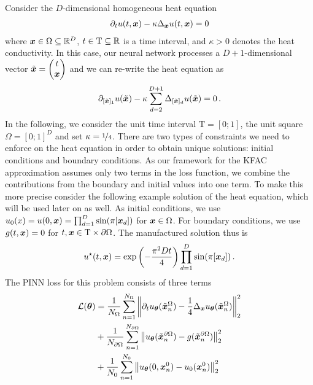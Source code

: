 Consider the $D$-dimensional%
homogeneous heat equation
\begin{align*}
  \partial_{t} u(t, {\bm{x}})
  -
  \kappa \Delta_{{\bm{x}}} u(t, {\bm{x}})
  =
  0
\end{align*}
where ${\bm{x}} \in \Omega \subseteq {\mathbb{R}}^D$, $t \in \mathrm{T} \subseteq {\mathbb{R}}$ is a time interval, and $\kappa >0$ denotes the heat conductivity. In this case, our neural network processes a $D+1$-dimensional vector $\tilde{{\bm{x}}} =
\begin{pmatrix} t \\ {\bm{x}} \end{pmatrix}$ and we can re-write the heat equation as
\begin{align*}
  \partial_{[\tilde{{\bm{x}}}]_1} u(\tilde{{\bm{x}}})
  -
  \kappa \sum_{d=2}^{D+1} \Delta_{[\tilde{{\bm{x}}}]_d} u(\tilde{{\bm{x}}})
  =
  0\,.
\end{align*}
In the following, we consider the unit time interval $\mathrm{T} = [0;1]$, the unit square $\Omega = [0;1]^D$ and set $\kappa = \nicefrac{1}{4}$. There are two types of constraints we need to enforce on the heat equation in order to obtain unique solutions: initial conditions and boundary conditions. As our framework for the KFAC approximation assumes only two terms in the loss function, we combine the contributions from the boundary and initial values into one term. To make this more precise consider the following example solution of the heat equation, which will be used later on as well.
As initial conditions, we use $u_0(x) = u(0, {\bm{x}}) = \prod_{d=1}^D \sin(\pi [{\bm{x}}_d])$ for ${\bm{x}} \in \Omega$.
For boundary conditions, we use $g(t, {\bm{x}}) = 0$ for $t, {\bm{x}} \in \mathrm{T} \times \partial\Omega$.
The manufactured solution thus is
\begin{align*}
  u^{\star}(t, {\bm{x}})
  =
  \exp \left(-\frac{\pi^2 D t}{4} \right)
  \prod_{d=1}^D \sin(\pi [{\bm{x}}_d])\,.
\end{align*}
The PINN loss for this problem consists of three terms
\begin{align*}
  {\mathcal{L}}({\bm{\theta}})
  &=
    \frac{1}{N_{\Omega}}
    \sum_{n=1}^{N_{\Omega}}
    \left\lVert
    \partial_t u_{{\bm{\theta}}}(\tilde{{\bm{x}}}_n^{\Omega})
    -
    \frac{1}{4} \Delta_{{\bm{x}}} u_{{\bm{\theta}}}(\tilde{{\bm{x}}}_n^{\Omega})
    \right\rVert^2_2
  \\
  &+
    \frac{1}{N_{\partial\Omega}}
    \sum_{n=1}^{N_{\partial\Omega}}
    \left\lVert
    u_{{\bm{\theta}}}(\tilde{{\bm{x}}}_n^{\partial\Omega})
    -
    g(\tilde{{\bm{x}}}_n^{\partial\Omega})
    \right\rVert^2_2
  \\
  &+
    \frac{1}{N_0}
    \sum_{n=1}^{N_0}
    \left\lVert
    u_{{\bm{\theta}}}(0, {\bm{x}}_n^0)
    -
    u_0( {\bm{x}}_n^0)
    \right\rVert^2_2
\end{align*}
